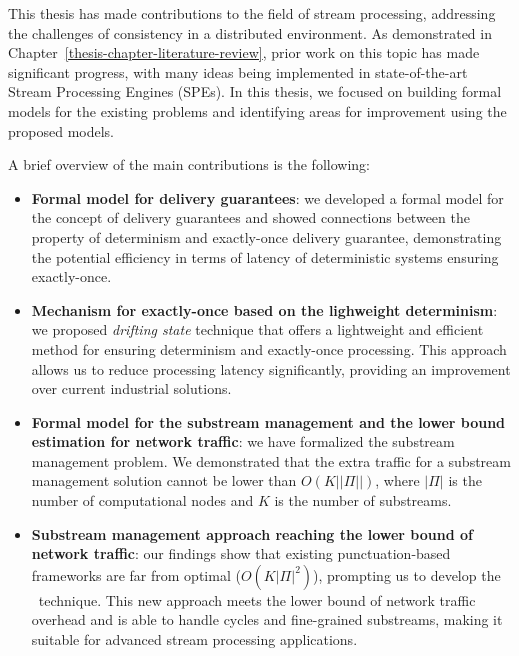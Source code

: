 This thesis has made contributions to the field of stream processing, addressing the challenges of consistency in a distributed environment. As demonstrated in Chapter~\ref{thesis-chapter-literature-review}, prior work on this topic has made significant progress, with many ideas being implemented in state-of-the-art Stream Processing Engines (SPEs). In this thesis, we focused on building formal models for the existing problems and identifying areas for improvement using the proposed models. 

A brief overview of the main contributions is the following:
\begin{itemize}
    \item {\bf Formal model for delivery guarantees}: we developed a formal model for the concept of delivery guarantees and showed connections between the property of determinism and exactly-once delivery guarantee, demonstrating the potential efficiency in terms of latency of deterministic systems ensuring exactly-once.
    \item {\bf Mechanism for exactly-once based on the lighweight determinism}: we proposed {\em drifting state} technique that offers a lightweight and efficient method for ensuring determinism and exactly-once processing. This approach allows us to reduce processing latency significantly, providing an improvement over current industrial solutions.
    \item {\bf Formal model for the substream management and the lower bound estimation for network traffic}: we have formalized the substream management problem. We demonstrated that the extra traffic for a substream management solution cannot be lower than $O(K||\Pi||)$, where $|\Pi|$ is the number of computational nodes and $K$ is the number of substreams. 
    \item {\bf Substream management approach reaching the lower bound of network traffic}: our findings show that existing punctuation-based frameworks are far from optimal ($O(K|\Pi|^2)$), prompting us to develop the \tracker\ technique. This new approach meets the lower bound of network traffic overhead and is able to handle cycles and fine-grained substreams, making it suitable for advanced stream processing applications.
\end{itemize}

